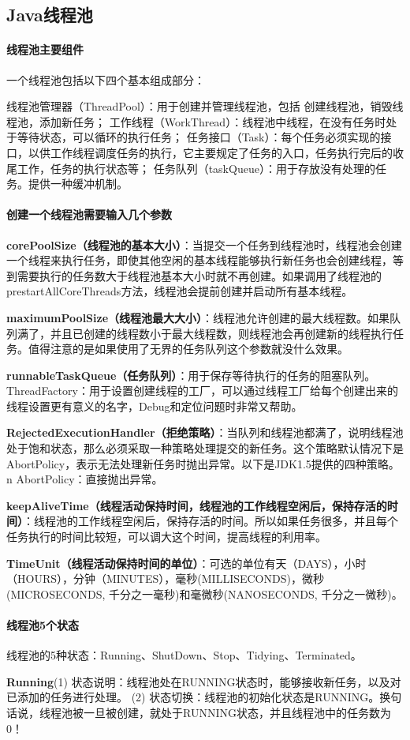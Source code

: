 \documentclass[../../../interview-questions.tex]{subfiles}
\begin{document}
\subsection{Java线程池}

\paragraph{线程池主要组件}

一个线程池包括以下四个基本组成部分：

线程池管理器（ThreadPool）：用于创建并管理线程池，包括 创建线程池，销毁线程池，添加新任务；
工作线程（WorkThread）：线程池中线程，在没有任务时处于等待状态，可以循环的执行任务；
任务接口（Task）：每个任务必须实现的接口，以供工作线程调度任务的执行，它主要规定了任务的入口，任务执行完后的收尾工作，任务的执行状态等；
任务队列（taskQueue）：用于存放没有处理的任务。提供一种缓冲机制。

\paragraph{创建一个线程池需要输入几个参数}

\textbf{corePoolSize（线程池的基本大小）}：当提交一个任务到线程池时，线程池会创建一个线程来执行任务，即使其他空闲的基本线程能够执行新任务也会创建线程，等到需要执行的任务数大于线程池基本大小时就不再创建。如果调用了线程池的prestartAllCoreThreads方法，线程池会提前创建并启动所有基本线程。

\textbf{maximumPoolSize（线程池最大大小）}：线程池允许创建的最大线程数。如果队列满了，并且已创建的线程数小于最大线程数，则线程池会再创建新的线程执行任务。值得注意的是如果使用了无界的任务队列这个参数就没什么效果。

\textbf{runnableTaskQueue（任务队列）}：用于保存等待执行的任务的阻塞队列。
ThreadFactory：用于设置创建线程的工厂，可以通过线程工厂给每个创建出来的线程设置更有意义的名字，Debug和定位问题时非常又帮助。

\textbf{RejectedExecutionHandler（拒绝策略）}：当队列和线程池都满了，说明线程池处于饱和状态，那么必须采取一种策略处理提交的新任务。这个策略默认情况下是AbortPolicy，表示无法处理新任务时抛出异常。以下是JDK1.5提供的四种策略。n  AbortPolicy：直接抛出异常。

\textbf{keepAliveTime（线程活动保持时间，线程池的​​工作线程空闲后​​​，​​保持存活的时间​​​）}：线程池的工作线程空闲后，保持存活的时间。所以如果任务很多，并且每个任务执行的时间比较短，可以调大这个时间，提高线程的利用率。

\textbf{TimeUnit（线程活动保持时间的单位）}：可选的单位有天（DAYS），小时（HOURS），分钟（MINUTES），毫秒(MILLISECONDS)，微秒(MICROSECONDS, 千分之一毫秒)和毫微秒(NANOSECONDS, 千分之一微秒)。

\paragraph{线程池5个状态}

线程池的5种状态：Running、ShutDown、Stop、Tidying、Terminated。

\textbf{Running}(1) 状态说明：线程池处在RUNNING状态时，能够接收新任务，以及对已添加的任务进行处理。
(2) 状态切换：线程池的初始化状态是RUNNING。换句话说，线程池被一旦被创建，就处于RUNNING状态，并且线程池中的任务数为0！
\end{document}
